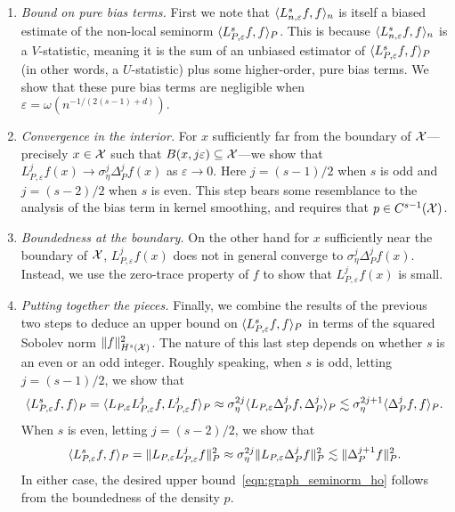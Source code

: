 \begin{enumerate}
	\item \emph{Bound on pure bias terms.} First we note that $\langle L_{n,\varepsilon}^s f, f \rangle_n$ is itself a biased estimate of the non-local seminorm $\langle L_{P,\varepsilon}^sf, f \rangle_{P}$. This is because $\langle L_{n,\varepsilon}^s f, f \rangle_n$ is a $V$-statistic, meaning it is the sum of an unbiased estimator of $\langle L_{P,\varepsilon}^sf, f \rangle_{P}$ (in other words, a $U$-statistic) plus some higher-order, pure bias terms. We show that these pure bias terms are negligible when $\varepsilon = \omega(n^{-1/(2(s - 1) + d)})$. 
	\item \emph{Convergence in the interior.} For $x$ sufficiently far from the boundary of $\mathcal{X}$---precisely $x \in \mathcal{X}$ such that $B(x,j\varepsilon) \subseteq \mathcal{X}$---we show that $L_{P,\varepsilon}^jf(x) \to \sigma_{\eta}^j \Delta_P^jf(x)$ as $\varepsilon \to 0$. Here $j = (s - 1)/2$ when $s$ is odd and $j = (s - 2)/2$ when $s$ is even. This step bears some resemblance to the analysis of the bias term in kernel smoothing, and requires that $p \in C^{s-1}(\mathcal{X})$.
	\item \emph{Boundedness at the boundary.} On the other hand for $x$ sufficiently near the boundary of $\mathcal{X}$, $L_{P,\varepsilon}^jf(x)$ does not in general converge to $\sigma_{\eta}^j\Delta_P^jf(x)$. Instead, we use the zero-trace property of $f$ to show that $L_{P,\varepsilon}^jf(x)$ is small.
	\item \emph{Putting together the pieces.} Finally, we combine the results of the previous two steps to deduce an upper bound on $\langle L_{P,\varepsilon}^sf, f \rangle_{P}$ in terms of the squared Sobolev norm $\|f\|_{H^s(\mathcal{X})}^2$. The nature of this last step depends on whether $s$ is an even or an odd integer. Roughly speaking, when $s$ is odd, letting $j = (s - 1)/2$, we show that  
	\begin{equation*}\langle L_{P,\varepsilon}^sf, f \rangle_P = \langle L_{P,\varepsilon}L_{P,\varepsilon}^jf, L_{P,\varepsilon}^jf \rangle_P \approx \sigma_{\eta}^{2j}\langle L_{P,\varepsilon}\Delta_P^jf, \Delta_P^j \rangle_{P} \lesssim \sigma_{\eta}^{2j + 1} \langle \Delta_P^jf, f \rangle_{P}.
	\end{equation*}
	When $s$ is even, letting $j = (s - 2)/2$, we show that
	\begin{equation*}
	\langle L_{P,\varepsilon}^sf, f \rangle_P = \|L_{P,\varepsilon}L_{P,\varepsilon}^{j}f\|_{P}^2 \approx \sigma_{\eta}^{2j}\|L_{P,\varepsilon} \Delta_P^jf\|_P^2 \lesssim \|\Delta_P^{j + 1}f\|_P^2.
	\end{equation*}
	In either case, the desired upper bound~\eqref{eqn:graph_seminorm_ho} follows from the boundedness of the density $p$.
\end{enumerate}

